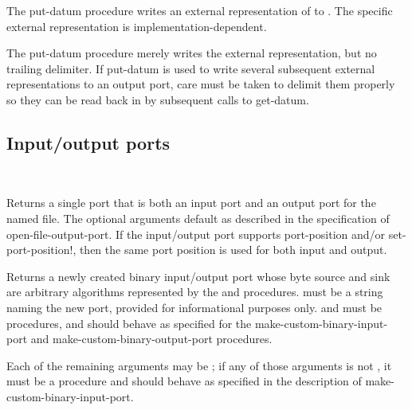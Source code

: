 \begin{entry}{%
}

The {\cf put-datum} procedure writes an external representation of
 to .
The specific external representation is implementation-dependent.

\begin{note}
  The {\cf put-datum} procedure merely writes the external
  representation, but no trailing delimiter.  If {\cf put-datum} is
  used to write several subsequent external representations to an
  output port, care must be taken to delimit them properly so they can
  be read back in by subsequent calls to {\cf get-datum}.
\end{note}
\end{entry}


\subsection{Input/output ports}

\begin{entry}{%
\\
}
   
Returns a single port that is both an input port and an
output port for the named file.
The optional arguments default as described in the specification
of {\cf open-file-output-port}.
If the input/output port supports {\cf port-position} and/or
{\cf set-port-position!}, then the same port position is used
for both input and output.
\end{entry}

\begin{entry}{%
}

Returns a newly created binary input/output port whose
byte source and sink are
arbitrary algorithms represented by the  and 
procedures.
 must be a string naming the new port,
provided for informational purposes only.
 and  must be procedures,
and should behave as specified for the
{\cf make-custom-binary-input-port} and
{\cf make-custom-binary-output-port} procedures.

Each of the remaining arguments may be \schfalse{}; if any of
those arguments is not \schfalse{}, it must be a procedure and
should behave as specified in the description of
{\cf make-custom-binary-input-port}.
\end{entry}



